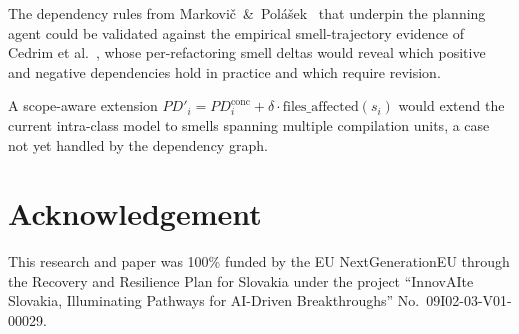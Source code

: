 \documentclass[conference]{IEEEtran}
\begin{document}
The dependency rules from Markovič~\&~Polášek~\cite{markovic2016refaktorovanie}
that underpin the planning agent could be validated against the empirical
smell-trajectory evidence of Cedrim et al.~\cite{cedrim2017}, whose
per-refactoring smell deltas would reveal which positive and negative
dependencies hold in practice and which require revision.

A scope-aware extension
$PD'_i = PD^{\mathrm{conc}}_i + \delta \cdot \mathrm{files\_affected}(s_i)$
would extend the current intra-class model to smells spanning multiple
compilation units, a case not yet handled by the dependency graph.

\section*{Acknowledgement}

This research and paper was 100\% funded by the EU NextGenerationEU through
the Recovery and Resilience Plan for Slovakia under the project
``InnovAIte Slovakia, Illuminating Pathways for AI-Driven Breakthroughs''
No.~09I02-03-V01-00029.
\end{document}
